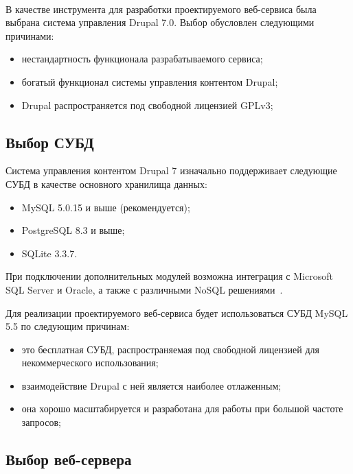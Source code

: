 \paragraph{}
В качестве инструмента для разработки проектируемого веб-сервиса была выбрана система управления Drupal 7.0.
Выбор обусловлен следующими причинами:
\begin{itemize}
\item
  нестандартность функционала разрабатываемого сервиса;
\item
  богатый функционал системы управления контентом Drupal;
\item 
  Drupal распространяется под свободной лицензией GPLv3;
\end{itemize}  

\subsection{Выбор СУБД}
\label{ssec:choice_db}

Система управления контентом Drupal 7 изначально поддерживает следующие СУБД 
в качестве основного хранилища данных:
\begin{itemize} 
\item
  MySQL 5.0.15 и выше (рекомендуется);

\item
  PostgreSQL 8.3 и выше;

\item
  SQLite 3.3.7.
\end{itemize}

При подключении дополнительных модулей возможна интеграция с Microsoft SQL Server и Oracle,
а также с различными NoSQL решениями~\cite{drupal_database}.

Для реализации проектируемого веб-сервиса будет использоваться СУБД MySQL 5.5 по следующим причинам:
\begin{itemize}
\item
  это бесплатная СУБД, распространяемая под свободной лицензией для некоммерческого использования;
\item
  взаимодействие Drupal с ней является наиболее отлаженным;
\item
  она хорошо масштабируется и разработана для работы при большой частоте запросов;
\end{itemize}

\subsection{Выбор веб-сервера}
\label{ssec:choice_web-server}

